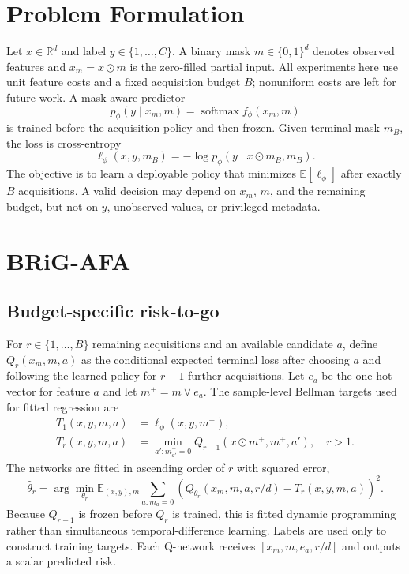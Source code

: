 \documentclass[10pt]{article}
\newcommand{\R}{\mathbb{R}}
\newcommand{\E}{\mathbb{E}}
\begin{document}
\section{Problem Formulation}
Let $x\in\R^d$ and label $y\in\{1,\ldots,C\}$. A binary mask $m\in\{0,1\}^d$ denotes observed features and $x_m=x\odot m$ is the zero-filled partial input. All experiments here use unit feature costs and a fixed acquisition budget $B$; nonuniform costs are left for future work. A mask-aware predictor
\begin{equation}
 p_\phi(y\mid x_m,m)=\operatorname{softmax} f_\phi(x_m,m)
\end{equation}
is trained before the acquisition policy and then frozen. Given terminal mask $m_B$, the loss is cross-entropy
\begin{equation}
 \ell_\phi(x,y,m_B)=-\log p_\phi(y\mid x\odot m_B,m_B).
\end{equation}
The objective is to learn a deployable policy that minimizes $\E[\ell_\phi]$ after exactly $B$ acquisitions. A valid decision may depend on $x_m$, $m$, and the remaining budget, but not on $y$, unobserved values, or privileged metadata.

\section{BRiG-AFA}\label{sec:method}
\subsection{Budget-specific risk-to-go}
For $r\in\{1,\ldots,B\}$ remaining acquisitions and an available candidate $a$, define $Q_r(x_m,m,a)$ as the conditional expected terminal loss after choosing $a$ and following the learned policy for $r-1$ further acquisitions. Let $e_a$ be the one-hot vector for feature $a$ and let $m^+=m\lor e_a$. The sample-level Bellman targets used for fitted regression are
\begin{align}
 T_1(x,y,m,a)&=\ell_\phi(x,y,m^+),\label{eq:terminal}\\
 T_r(x,y,m,a)&=\min_{a':m^+_{a'}=0}Q_{r-1}(x\odot m^+,m^+,a'),\quad r>1.\label{eq:bellman}
\end{align}
The networks are fitted in ascending order of $r$ with squared error,
\begin{equation}
 \hat\theta_r=\arg\min_{\theta_r}\E_{(x,y),m}\sum_{a:m_a=0}\left(Q_{\theta_r}(x_m,m,a,r/d)-T_r(x,y,m,a)\right)^2.
\end{equation}
Because $Q_{r-1}$ is frozen before $Q_r$ is trained, this is fitted dynamic programming rather than simultaneous temporal-difference learning. Labels are used only to construct training targets. Each Q-network receives $[x_m,m,e_a,r/d]$ and outputs a scalar predicted risk.
\end{document}
